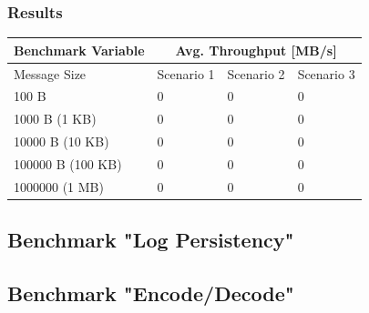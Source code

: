 \subsubsection{Results}
\begin{table}[H]
\centering
\begin{tabular}{|l|l|l|l|}
\hline
{\bf Benchmark Variable} & \multicolumn{3}{c|}{{\bf Avg. Throughput {[}MB/s{]}}} \\ \hline
Message Size             & Scenario 1       & Scenario 2       & Scenario 3      \\ \hline
100 B                    & 0                & 0                & 0               \\ \hline
1000 B (1 KB)            & 0                & 0                & 0               \\ \hline
10000 B (10 KB)          & 0                & 0                & 0               \\ \hline
100000 B (100 KB)        & 0                & 0                & 0               \\ \hline
1000000 (1 MB)           & 0                & 0                & 0               \\ \hline
\end{tabular}
\end{table}

\subsection{Benchmark "Log Persistency"}

\subsection{Benchmark "Encode/Decode"}





